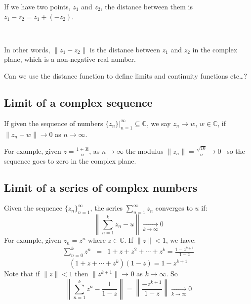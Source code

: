 \documentclass{article}
\newcommand{\mathi}{\mathrm{i}}
\newcommand{\nosymbol}{}
\begin{document}
If we have two points, $z_1$ and $z_2$, the distance between them is $z_1 -
z_2 = z_1 + (- z_2)$.



\begin{center}
\end{center}

\

In other words, $\| z_1 - z_2 \|$ is the distance between $z_1$ and $z_2$ in
the complex plane, which is a non-negative real number.

Can we use the distance function to define limits and continuity functions
etc{\ldots}?

\subsection*{Limit of a complex sequence}

If given the sequence of numbers $\{ z_n \} |^{\infty}_{n = 1} \subseteq
\mathbb{C}$, we say $z_n \rightarrow w$, $w \in \mathbb{C}$, if $\| z_n - w \|
\rightarrow 0$ as $n \rightarrow \infty$.

For example, given $z = \frac{1 + 3 \mathi}{n}$, as $n \rightarrow \infty$ the
modulus $\| z_n \| = \frac{\sqrt{10}}{n} \rightarrow 0$ \ so the sequence goes
to zero in the complex plane.

\subsection*{Limit of a series of complex numbers}

Given the sequence $\{ z_n \}_{n = 1}^{\infty}$, the series $\sum_{n =
1}^{\infty} z_n$ converges to $u$ if:
\[ \left\| \sum_{n = 1}^k z_n - u \right\| \xrightarrow[k \rightarrow
   \infty]{} 0 \]
For example, given $z_n = z^n$ where $z \in \mathbb{C}$. If $\| z \| < 1$, we
have:
\begin{eqnarray*}
  \sum_{n = 0}^k z^n & = & 1 + z + z^2 + \cdots + z^k = \frac{1 - z^{k + 1}}{1
  - z}
\end{eqnarray*}
\[ (1 + z + \cdots + z^k) (1 - z) = 1 - z^{k + 1} \]
Note that if $\| z \| < 1$ then $\| z^{k + 1} \| \rightarrow_{\nosymbol} 0$ as
$k \rightarrow \infty$. So
\[ \left\| \sum_{n = 1}^k z^n - \frac{1}{1 - z} \right\| = \left\| \frac{-
   z^{k + 1}}{1 - z} \right\| \xrightarrow[k \rightarrow \infty]{} 0 \]
\end{document}
